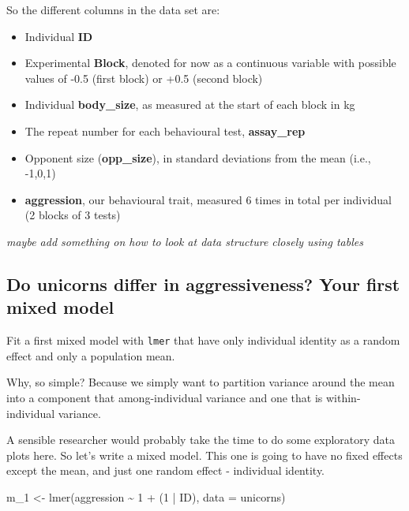 \documentclass[
  12pt,
]{book}
\newenvironment{Shaded}{\begin{snugshade}}{\end{snugshade}}
\newcommand{\AttributeTok}[1]{\textcolor[rgb]{0.77,0.63,0.00}{#1}}
\newcommand{\DecValTok}[1]{\textcolor[rgb]{0.00,0.00,0.81}{#1}}
\newcommand{\FunctionTok}[1]{\textcolor[rgb]{0.00,0.00,0.00}{#1}}
\newcommand{\NormalTok}[1]{#1}
\newcommand{\OtherTok}[1]{\textcolor[rgb]{0.56,0.35,0.01}{#1}}
\newcommand{\SpecialCharTok}[1]{\textcolor[rgb]{0.00,0.00,0.00}{#1}}
\providecommand{\tightlist}{%
  \setlength{\itemsep}{0pt}\setlength{\parskip}{0pt}}
\begin{document}
So the different columns in the data set are:

\begin{itemize}
\tightlist
\item
  Individual \textbf{ID}
\item
  Experimental \textbf{Block}, denoted for now as a continuous variable with possible values of -0.5 (first block) or +0.5 (second block)
\item
  Individual \textbf{body\_size}, as measured at the start of each block in kg
\item
  The repeat number for each behavioural test, \textbf{assay\_rep}
\item
  Opponent size (\textbf{opp\_size}), in standard deviations from the mean (i.e., -1,0,1)
\item
  \textbf{aggression}, our behavioural trait, measured 6 times in total per individual (2 blocks of 3 tests)
\end{itemize}

\emph{maybe add something on how to look at data structure closely using tables}

\hypertarget{do-unicorns-differ-in-aggressiveness-your-first-mixed-model}{%
\subsection{Do unicorns differ in aggressiveness? Your first mixed model}\label{do-unicorns-differ-in-aggressiveness-your-first-mixed-model}}

Fit a first mixed model with \texttt{lmer} that have only individual identity as a random effect and only a population mean.

Why, so simple? Because we simply want to partition variance around the mean into a component that among-individual variance and one that is within-individual variance.

A sensible researcher would probably take the time to do some exploratory data plots here. So let's write a mixed model. This one is going to have no fixed effects except the mean, and just one random effect - individual identity.

\begin{Shaded}
\begin{Highlighting}[]
\NormalTok{m\_1 }\OtherTok{\textless{}{-}} \FunctionTok{lmer}\NormalTok{(aggression }\SpecialCharTok{\textasciitilde{}} \DecValTok{1} \SpecialCharTok{+}\NormalTok{ (}\DecValTok{1} \SpecialCharTok{|}\NormalTok{ ID), }\AttributeTok{data =}\NormalTok{ unicorns)}
\end{Highlighting}
\end{Shaded}
\end{document}
